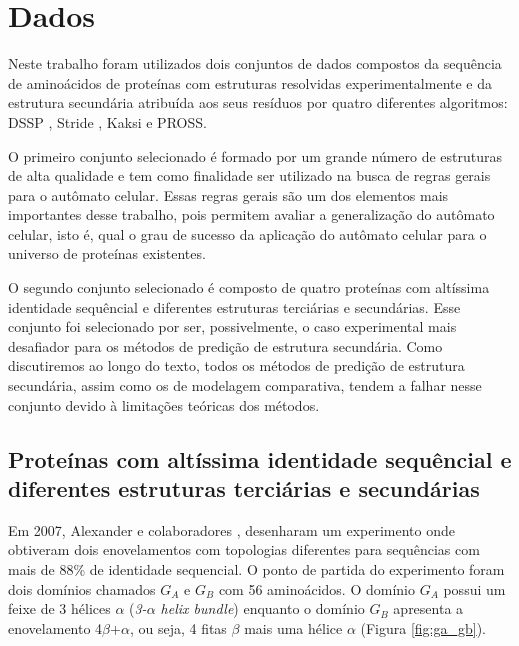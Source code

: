 \chapter{Dados}

Neste trabalho foram utilizados dois conjuntos de dados compostos da sequência de aminoácidos de proteínas com estruturas resolvidas experimentalmente e da estrutura secundária atribuída aos seus resíduos por quatro diferentes algoritmos: DSSP \cite{Kabsch:1978}, Stride \cite{Frishman:1990}, Kaksi \cite{Martin:2000} e PROSS\cite{Srinivasan:1994}.

O primeiro conjunto selecionado é formado por um grande número de estruturas de alta qualidade e tem como finalidade ser utilizado na busca de regras gerais para o autômato celular. Essas regras gerais são um dos elementos mais importantes desse trabalho, pois permitem avaliar a generalização do autômato celular, isto é, qual o grau de sucesso da aplicação do autômato celular para o universo de proteínas existentes.

O segundo conjunto selecionado é composto de quatro proteínas com altíssima identidade sequêncial e diferentes estruturas terciárias e secundárias. Esse conjunto foi selecionado por ser, possivelmente, o caso experimental mais desafiador para os métodos de predição de estrutura secundária. Como discutiremos ao longo do texto, todos os métodos de predição de estrutura secundária, assim como os de modelagem comparativa, tendem a falhar nesse conjunto devido à limitações teóricas dos métodos.

\section{Proteínas com altíssima identidade sequêncial e diferentes estruturas terciárias e secundárias}

Em 2007, Alexander e colaboradores \cite{17609385}, desenharam um experimento onde obtiveram dois enovelamentos com topologias diferentes para sequências com mais de 88\% de identidade sequencial. O ponto de partida do experimento foram dois domínios chamados $G_A$ e $G_B$  com 56 aminoácidos.  O domínio $G_A$ possui um feixe de 3 hélices $\alpha$ (\textit{3-$\alpha$ helix bundle}) enquanto o domínio $G_B$ apresenta a enovelamento 4$\beta$+$\alpha$, ou seja, 4 fitas $\beta$ mais uma hélice $\alpha$ (Figura \ref{fig:ga_gb}).

